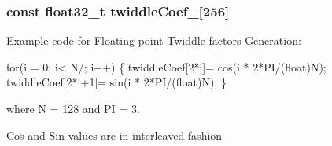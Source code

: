 \subsubsection[{\texorpdfstring{twiddle\+Coef\+\_\+128}{twiddleCoef_128}}]{\setlength{\rightskip}{0pt plus 5cm}const float32\+\_\+t twiddle\+Coef\+\_\mbox{[}256\mbox{]}}\hypertarget{group__CFFT__CIFFT_ga948433536dafaac1381decfccf4e2d9c}{}\label{group__CFFT__CIFFT_ga948433536dafaac1381decfccf4e2d9c}
\begin{DoxyParagraph}{}
Example code for Floating-\/point Twiddle factors Generation\+: 
\end{DoxyParagraph}
\begin{DoxyParagraph}{}

\begin{DoxyPre}for(i = 0; i< N/; i++)
\{
  twiddleCoef[2*i]= cos(i * 2*PI/(float)N);
  twiddleCoef[2*i+1]= sin(i * 2*PI/(float)N);
\} \end{DoxyPre}
 
\end{DoxyParagraph}
\begin{DoxyParagraph}{}
where N = 128 and PI = 3. 
\end{DoxyParagraph}
\begin{DoxyParagraph}{}
Cos and Sin values are in interleaved fashion 
\end{DoxyParagraph}
